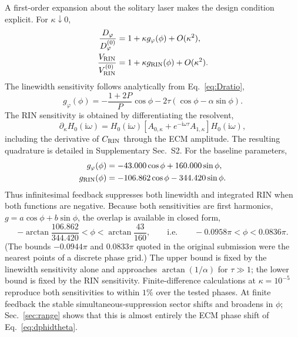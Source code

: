 \documentclass{optica-article}
\newif\ifmarked
\newcommand{\rev}[1]{\ifmarked{\color{blue}#1}\else#1\fi}
\newcommand{\ii}{\mathrm{i}}
\begin{document}
A first-order expansion about the solitary laser makes the design condition explicit. For $\kappa\downarrow0$,
\begin{align}
 \frac{D_\varphi}{D_\varphi^{(0)}}&=1+\kappa g_\varphi(\phi)+O(\kappa^2), \label{eq:weakD}\\
 \frac{V_{\rm RIN}}{V_{\rm RIN}^{(0)}}&=1+\kappa g_{\rm RIN}(\phi)+O(\kappa^2). \label{eq:weakR}
\end{align}
The linewidth sensitivity follows analytically from Eq.~\eqref{eq:Dratio},
\begin{equation}
 g_\varphi(\phi)=-\frac{1+2P}{P}\cos\phi
 -2\tau(\cos\phi-\alpha\sin\phi).
 \label{eq:gphase}
\end{equation}
The RIN sensitivity is obtained by differentiating the resolvent,
\begin{equation}
 \partial_\kappa H_0(\ii\omega)=H_0(\ii\omega)
 \left[A_{0,\kappa}+e^{-\ii\omega\tau}A_{1,\kappa}\right]H_0(\ii\omega),
 \label{eq:resolventsensitivity}
\end{equation}
including the derivative of $C_{\rm RIN}$ through the ECM amplitude. The resulting quadrature is detailed in Supplementary Sec.~S2. For the baseline parameters,
\begin{align}
 g_\varphi(\phi)&=-43.000\cos\phi+160.000\sin\phi,\\
 g_{\rm RIN}(\phi)&=-106.862\cos\phi-344.420\sin\phi.
 \label{eq:gs}
\end{align}
Thus infinitesimal feedback suppresses both linewidth and integrated RIN when both functions are negative. \rev{Because both sensitivities are first harmonics, $g=a\cos\phi+b\sin\phi$, the overlap is available in closed form,
\begin{equation}
 -\arctan\frac{106.862}{344.420}<\phi<\arctan\frac{43}{160},
 \qquad\text{i.e.}\qquad
 -0.0958\pi<\phi<0.0836\pi.
 \label{eq:weakwindow}
\end{equation}
(The bounds $-0.0944\pi$ and $0.0833\pi$ quoted in the original submission were the nearest points of a discrete phase grid.) The upper bound is fixed by the linewidth sensitivity alone and approaches $\arctan(1/\alpha)$ for $\tau\gg1$; the lower bound is fixed by the RIN sensitivity.} Finite-difference calculations at $\kappa=10^{-5}$ reproduce both sensitivities to within $1\%$ over the tested phases. At finite feedback the stable simultaneous-suppression sector shifts and broadens \rev{in $\phi$; Sec.~\ref{sec:range} shows that this is almost entirely the ECM phase shift of Eq.~\eqref{eq:dphidtheta}.}
\end{document}
